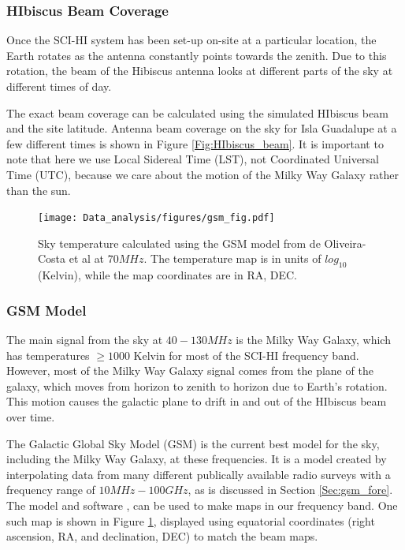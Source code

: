 \subsubsection{HIbiscus Beam Coverage}

Once the SCI-HI system has been set-up on-site at a particular location, the Earth rotates as the antenna constantly points towards the zenith. Due to this rotation, the beam of the Hibiscus antenna looks at different parts of the sky at different times of day. 

The exact beam coverage can be calculated using the simulated HIbiscus beam and the site latitude. Antenna beam coverage on the sky for Isla Guadalupe at a few different times is shown in Figure \ref{Fig:HIbiscus_beam}.  It is important to note that here we use Local Sidereal Time (LST), not Coordinated Universal Time (UTC), because we care about the motion of the Milky Way Galaxy rather than the sun.  

\begin{figure}[htb]
\begin{center}
\texttt{[image: Data\_analysis/figures/gsm\_fig.pdf]}
\caption{Sky temperature calculated using the GSM model from de Oliveira-Costa et al \cite{GSM_model} at $70 MHz$. The temperature map is in units of $log_{10}$(Kelvin), while the map coordinates are in RA, DEC. }
\label{Fig:GSM_model}
\end{center}
\end{figure}

\subsubsection{GSM Model}\label{Sec:GSM}

The main signal from the sky at $40-130 MHz$ is the Milky Way Galaxy, which has temperatures $\geq 1000$ Kelvin for most of the SCI-HI frequency band. However, most of the Milky Way Galaxy signal comes from the plane of the galaxy, which moves from horizon to zenith to horizon due to Earth's rotation. This motion causes the galactic plane to drift in and out of the HIbiscus beam over time. 

The Galactic Global Sky Model (GSM) is the current best model for the sky, including the Milky Way Galaxy, at these frequencies. It is a model created by interpolating data from many different publically available radio surveys with a frequency range of $10 MHz - 100 GHz$, as is discussed in Section \ref{Sec:gsm_fore}. The model and software \cite{GSM_model}, can be used to make maps in our frequency band. One such map is shown in Figure \ref{Fig:GSM_model}, displayed using equatorial coordinates (right ascension, RA, and declination, DEC) to match the beam maps. 

